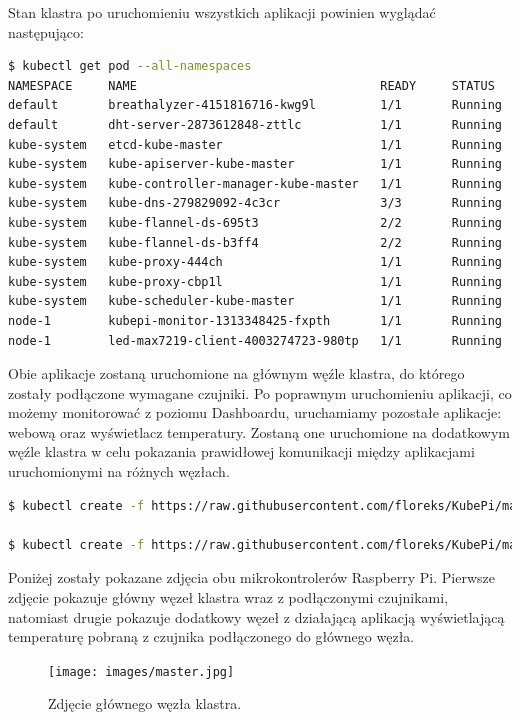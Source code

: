 \documentclass[12pt]{report}
\begin{document}
{\noindent Stan klastra po uruchomieniu wszystkich aplikacji powinien wyglądać następująco:
\begin{lstlisting}[language=bash]
$ kubectl get pod --all-namespaces
NAMESPACE     NAME                                  READY     STATUS
default       breathalyzer-4151816716-kwg9l         1/1       Running
default       dht-server-2873612848-zttlc           1/1       Running
kube-system   etcd-kube-master                      1/1       Running
kube-system   kube-apiserver-kube-master            1/1       Running
kube-system   kube-controller-manager-kube-master   1/1       Running
kube-system   kube-dns-279829092-4c3cr              3/3       Running
kube-system   kube-flannel-ds-695t3                 2/2       Running
kube-system   kube-flannel-ds-b3ff4                 2/2       Running
kube-system   kube-proxy-444ch                      1/1       Running
kube-system   kube-proxy-cbp1l                      1/1       Running
kube-system   kube-scheduler-kube-master            1/1       Running
node-1        kubepi-monitor-1313348425-fxpth       1/1       Running
node-1        led-max7219-client-4003274723-980tp   1/1       Running
\end{lstlisting}

\noindent Obie aplikacje zostaną uruchomione na głównym węźle klastra, do którego zostały podłączone wymagane czujniki. Po poprawnym uruchomieniu aplikacji, co możemy monitorować z poziomu Dashboardu, uruchamiamy pozostałe aplikacje: webową oraz wyświetlacz temperatury. Zostaną one uruchomione na dodatkowym węźle klastra w celu pokazania prawidłowej komunikacji między aplikacjami uruchomionymi na różnych węzłach.
\begin{lstlisting}[language=bash]
$ kubectl create -f https://raw.githubusercontent.com/floreks/KubePi/master/config/kubepi-monitor-arm.yaml

$ kubectl create -f https://raw.githubusercontent.com/floreks/KubePi/master/config/led-max7219-client-arm.yaml
\end{lstlisting}

\noindent Poniżej zostały pokazane zdjęcia obu mikrokontrolerów Raspberry Pi. Pierwsze zdjęcie pokazuje główny węzeł klastra wraz z podłączonymi czujnikami, natomiast drugie pokazuje dodatkowy węzeł z działającą aplikacją wyświetlającą temperaturę pobraną z czujnika podłączonego do głównego węzła.
\begin{figure}[h]
	\centering
	\texttt{[image: images/master.jpg]}
	\caption{Zdjęcie głównego węzła klastra.}
\end{figure}

}
\end{document}
